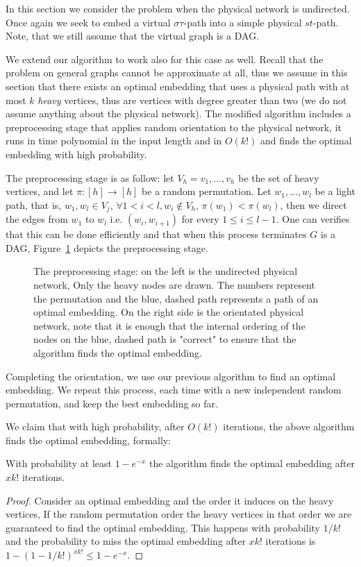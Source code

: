 In this section we consider the problem when the physical network is undirected.
Once again we seek to embed a virtual $\sigma\tau$-path 
into a simple physical $st$-path.
Note, that we still assume that the virtual graph is a DAG. 

We extend our algorithm to work also for this case as well.
Recall that the problem on general graphs cannot be approximate at all,
thus we assume in this section that there exists an optimal embedding that uses
a physical path with at most $k$ \emph{heavy} vertices, thus are vertices with
degree greater than two (we do not assume anything about the physical network).
The modified algorithm includes a preprocessing stage that applies
random orientation to the physical network, it runs in time polynomial in the
input length and in $O(k!)$ and finds the optimal embedding with high probability.

The preprocessing stage is as follow:
let $V_h = {v_1, \ldots, v_h}$ be the set of heavy vertices, and let 
$\pi:[h] \to [h]$ be a random permutation.
Let $w_1, \ldots, w_l$ be a light path, that is, $w_1, w_l \in V_j$, 
$\forall 1 < i < l, w_i \notin V_h$, $\pi(w_1) < \pi(w_l)$, then
we direct the edges from $w_1$ to $w_l$ i.e. $(w_i, w_{i+1})$ for every $1 \leq
i \leq l - 1$.
One can verifies that this can be done efficiently and that when this process
terminates $G$ is a DAG, Figure~\ref{fig:orientation} depicts the preprocessing
stage.

\begin{figure}[h]

\caption{
\label{fig:orientation}
The preprocessing stage: on the left is the undirected physical network,
Only the heavy nodes are drawn.
The numbers represent the permutation and the blue, dashed path represents a
path of an optimal embedding.
On the right side is the orientated physical network, 
note that it is enough that the internal ordering of the nodes on the blue,
dashed path is "correct" to ensure that the algorithm finds the optimal
embedding. }
\end{figure}

Completing the orientation, we use our previous algorithm to find an optimal
embedding.
We repeat this process, each time with a new independent random permutation, and
keep the best embedding so far.

We claim that with high probability, after $O(k!)$ iterations, the above
algorithm finds the optimal embedding, formally:

\begin{theorem}
With probability at least $1 - e^{-x}$ the algorithm finds the optimal embedding
after $xk!$ iterations.
\end{theorem}

\begin{proof}
Consider an optimal embedding and the order it induces on the heavy vertices,
If the random permutation order the heavy vertices in that order we are
guaranteed to find the optimal embedding.
This happens with probability $1/k!$ and the probability to miss the optimal
embedding after $xk!$ iterations is $1 - (1 - 1/k!)^{xk!} \leq 1 - e^{-x}$.
\end{proof}
